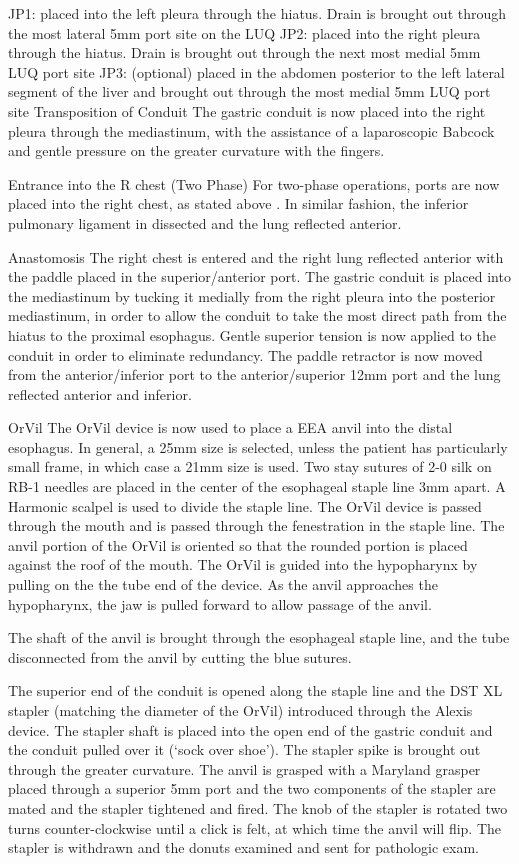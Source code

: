 \documentclass[
  letterpaper,
]{scrbook}
\begin{document}
JP1: placed into the left pleura through the hiatus. Drain is brought
out through the most lateral 5mm port site on the LUQ JP2: placed into
the right pleura through the hiatus. Drain is brought out through the
next most medial 5mm LUQ port site JP3: (optional) placed in the abdomen
posterior to the left lateral segment of the liver and brought out
through the most medial 5mm LUQ port site Transposition of Conduit The
gastric conduit is now placed into the right pleura through the
mediastinum, with the assistance of a laparoscopic Babcock and gentle
pressure on the greater curvature with the fingers.

Entrance into the R chest (Two Phase) For two-phase operations, ports
are now placed into the right chest, as stated above . In similar
fashion, the inferior pulmonary ligament in dissected and the lung
reflected anterior.

Anastomosis The right chest is entered and the right lung reflected
anterior with the paddle placed in the superior/anterior port. The
gastric conduit is placed into the mediastinum by tucking it medially
from the right pleura into the posterior mediastinum, in order to allow
the conduit to take the most direct path from the hiatus to the proximal
esophagus. Gentle superior tension is now applied to the conduit in
order to eliminate redundancy. The paddle retractor is now moved from
the anterior/inferior port to the anterior/superior 12mm port and the
lung reflected anterior and inferior.

OrVil The OrVil device is now used to place a EEA anvil into the distal
esophagus. In general, a 25mm size is selected, unless the patient has
particularly small frame, in which case a 21mm size is used. Two stay
sutures of 2-0 silk on RB-1 needles are placed in the center of the
esophageal staple line 3mm apart. A Harmonic scalpel is used to divide
the staple line. The OrVil device is passed through the mouth and is
passed through the fenestration in the staple line. The anvil portion of
the OrVil is oriented so that the rounded portion is placed against the
roof of the mouth. The OrVil is guided into the hypopharynx by pulling
on the the tube end of the device. As the anvil approaches the
hypopharynx, the jaw is pulled forward to allow passage of the anvil.

The shaft of the anvil is brought through the esophageal staple line,
and the tube disconnected from the anvil by cutting the blue sutures.

The superior end of the conduit is opened along the staple line and the
DST XL stapler (matching the diameter of the OrVil) introduced through
the Alexis device. The stapler shaft is placed into the open end of the
gastric conduit and the conduit pulled over it (`sock over shoe'). The
stapler spike is brought out through the greater curvature. The anvil is
grasped with a Maryland grasper placed through a superior 5mm port and
the two components of the stapler are mated and the stapler tightened
and fired. The knob of the stapler is rotated two turns
counter-clockwise until a click is felt, at which time the anvil will
flip. The stapler is withdrawn and the donuts examined and sent for
pathologic exam.
\end{document}

